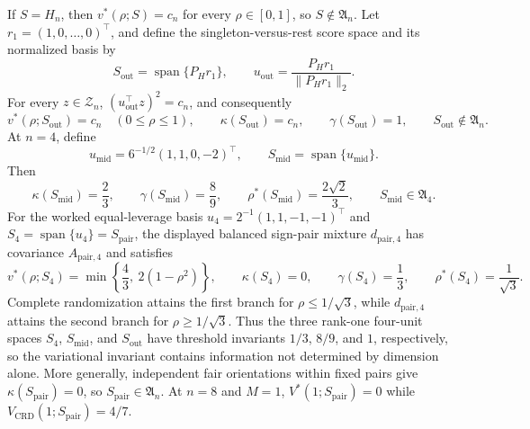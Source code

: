 If \(S=H_n\), then \(v^*(\rho;S)=c_n\) for every \(\rho\in[0,1]\), so \(S\notin\mathfrak A_n\). Let \(r_1=(1,0,\ldots,0)^\top\), and define the singleton-versus-rest score space and its normalized basis by
\[
S_{\mathrm{out}}=\operatorname{span}\{P_Hr_1\},
\qquad
u_{\mathrm{out}}=\frac{P_Hr_1}{\|P_Hr_1\|_2}.
\]
For every \(z\in\mathcal Z_n\), \((u_{\mathrm{out}}^\top z)^2=c_n\), and consequently
\[
v^*(\rho;S_{\mathrm{out}})=c_n\quad(0\leq\rho\leq1),
\qquad
\kappa(S_{\mathrm{out}})=c_n,
\qquad
\gamma(S_{\mathrm{out}})=1,
\qquad
S_{\mathrm{out}}\notin\mathfrak A_n.
\]
At \(n=4\), define
\[
u_{\mathrm{mid}}=6^{-1/2}(1,1,0,-2)^\top,
\qquad
S_{\mathrm{mid}}=\operatorname{span}\{u_{\mathrm{mid}}\}.
\]
Then
\[
\kappa(S_{\mathrm{mid}})=\frac23,
\qquad
\gamma(S_{\mathrm{mid}})=\frac89,
\qquad
\rho^*(S_{\mathrm{mid}})=\frac{2\sqrt2}{3},
\qquad
S_{\mathrm{mid}}\in\mathfrak A_4.
\]
For the worked equal-leverage basis \(u_4=2^{-1}(1,1,-1,-1)^\top\) and \(S_4=\operatorname{span}\{u_4\}=S_{\mathrm{pair}}\), the displayed balanced sign-pair mixture \(d_{\mathrm{pair},4}\) has covariance \(A_{\mathrm{pair},4}\) and satisfies
\[
v^*(\rho;S_4)=\min\left\{\frac43,\ 2(1-\rho^2)\right\},
\qquad
\kappa(S_4)=0,
\qquad
\gamma(S_4)=\frac13,
\qquad
\rho^*(S_4)=\frac1{\sqrt3}.
\]
Complete randomization attains the first branch for \(\rho\leq1/\sqrt3\), while \(d_{\mathrm{pair},4}\) attains the second branch for \(\rho\geq1/\sqrt3\). Thus the three rank-one four-unit spaces \(S_4\), \(S_{\mathrm{mid}}\), and \(S_{\mathrm{out}}\) have threshold invariants \(1/3\), \(8/9\), and \(1\), respectively, so the variational invariant contains information not determined by dimension alone. More generally, independent fair orientations within fixed pairs give \(\kappa(S_{\mathrm{pair}})=0\), so \(S_{\mathrm{pair}}\in\mathfrak A_n\). At \(n=8\) and \(M=1\), \(V^*(1;S_{\mathrm{pair}})=0\) while \(V_{\mathrm{CRD}}(1;S_{\mathrm{pair}})=4/7\).